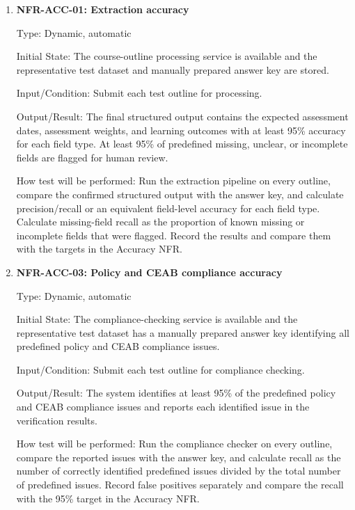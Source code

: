 \documentclass[12pt, titlepage]{article}
\begin{document}
\begin{enumerate}

\item{\label{NFR-ACC-01}\textbf{NFR-ACC-01: Extraction accuracy}\\}

Type: Dynamic, automatic

Initial State: The course-outline processing service is available and the
representative test dataset and manually prepared answer key are stored.
					
Input/Condition: Submit each test outline for processing.
					
Output/Result: The final structured output contains the expected assessment
dates, assessment weights, and learning outcomes with at least 95\% accuracy
for each field type. At least 95\% of predefined missing, unclear, or
incomplete fields are flagged for human review.
					
How test will be performed: Run the extraction pipeline on every outline,
compare the confirmed structured output with the answer key, and calculate
precision/recall or an equivalent field-level accuracy for each field type.
Calculate missing-field recall as the proportion of known missing or
incomplete fields that were flagged. Record the results and compare them with
the targets in the Accuracy NFR.

\item{\label{NFR-ACC-03}\textbf{NFR-ACC-03: Policy and CEAB compliance accuracy}\\}

Type: Dynamic, automatic

Initial State: The compliance-checking service is available and the
representative test dataset has a manually prepared answer key identifying
all predefined policy and CEAB compliance issues.

Input/Condition: Submit each test outline for compliance checking.

Output/Result: The system identifies at least 95\% of the predefined policy
and CEAB compliance issues and reports each identified issue in the
verification results.

How test will be performed: Run the compliance checker on every outline,
compare the reported issues with the answer key, and calculate recall as the
number of correctly identified predefined issues divided by the total number
of predefined issues. Record false positives separately and compare the
recall with the 95\% target in the Accuracy NFR.
					

\end{enumerate}
\end{document}
